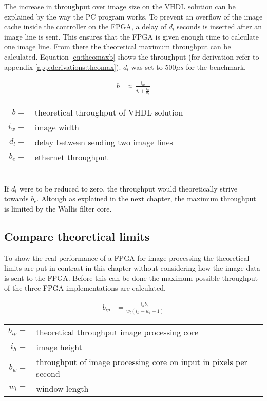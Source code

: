 The increase in throughput over image size on the VHDL solution can be explained
by the way the
PC program works. To prevent an overflow of the image cache inside the
controller on the FPGA, a delay of $d_l$ seconds is inserted after an image line
is sent. This ensures that the FPGA is given enough time to calculate one image
line. From there the theoretical maximum throughput can be calculated. Equation
\ref{eq:theomaxb} shows the throughput (for derivation refer to appendix 
\ref{app:derivations:theomax}). $d_l$ was set to $500\mu s$ for the benchmark.

\begin{align}
    b  & \approx \frac{i_w}{d_l + \frac{i_w}{b_e}}
    \label{eq:theomaxb}
\end{align}

\begin{tabular}{rl}
    $b     =$ & theoretical throughput of VHDL solution \\
    $i_w   =$ & image width \\
    $d_l   =$ & delay between sending two image lines \\
    $b_e   =$ & ethernet throughput \\
\end{tabular} \\

If $d_l$ were to be reduced to zero, the throughput would theoretically strive
towards $b_e$. Altough as explained in the next chapter, the maximum throughput
is limited by the Wallis filter core.

\subsection{Compare theoretical limits}
To show the real performance of a FPGA for image processing the theoretical
limits are put in contrast in this chapter without considering how the image
data is sent to the FPGA.
Before this can be done the maximum possible throughput of the three FPGA
implementations are calculated.

\begin{align}
    b_{ip}  & = \frac{i_hb_w}{w_l (i_h-w_l+1)}
    \label{eq:theomaxvhdlwallisshort}
\end{align}

\begin{tabular}{rl}
    $b_{ip}=$ & theoretical throughput image processing core \\
    $i_h   =$ & image height \\
    $b_w   =$ & throughput of image processing core on input in pixels per
    second \\
    $w_l   =$ & window length \\
\end{tabular} \\

